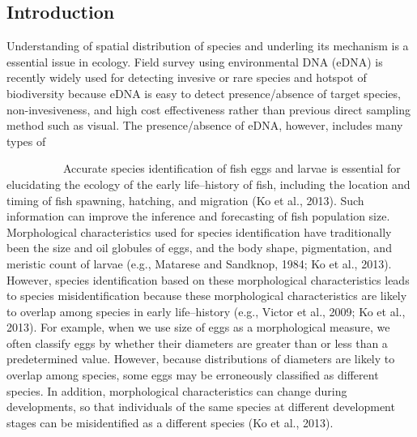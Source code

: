 \documentclass[12pt]{article}
\begin{document}
\newpage
\begin{linenumbers}
\section{Introduction}
Understanding of spatial distribution of species and underling its mechanism is a essential issue in ecology.
Field survey using environmental DNA (eDNA) is recently widely used for detecting invesive or rare species and hotspot of biodiversity because eDNA is easy to detect presence/absence of target species, non-invesiveness, and high cost effectiveness rather than previous direct sampling method such as visual.
The presence/absence of eDNA, however, includes many types of 

\ \ \ \ \ \ \ \ \ \
Accurate species identification of fish eggs and larvae is essential for elucidating the ecology of the early life--history of fish, including the location and timing of fish spawning, hatching, and migration (Ko et al., 2013). Such information can improve the inference and forecasting of fish population size. Morphological characteristics used for species identification have traditionally been the size and oil globules of eggs, and the body shape, pigmentation, and meristic count of larvae (e.g., Matarese and Sandknop, 1984; Ko et al., 2013). However, species identification based on these morphological characteristics leads to species misidentification because these morphological characteristics are likely to overlap among species in early life--history (e.g., Victor et al., 2009; Ko et al., 2013). For example, when we use size of eggs as a morphological measure, we often classify eggs by whether their diameters are greater than or less than a predetermined value. However, because distributions of diameters are likely to overlap among species, some eggs may be erroneously classified as different species. In addition, morphological characteristics can change during developments, so that individuals of the same species at different development stages can be misidentified as a different species (Ko et al., 2013).


\end{linenumbers}
\end{document}
